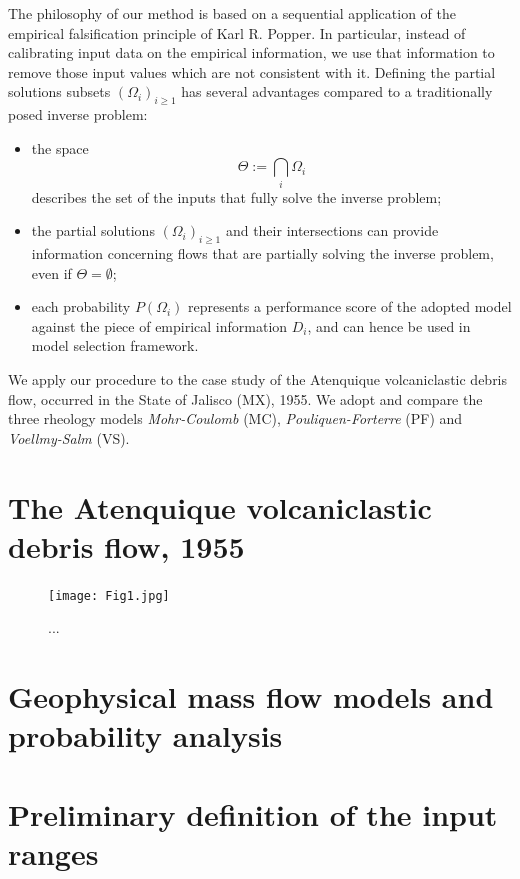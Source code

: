 \documentclass{article}
\begin{document}
The philosophy of our method is based on a sequential application of the empirical falsification principle of Karl R. Popper. In particular, instead of calibrating input data on the empirical information, we use that information to remove those input values which are not consistent with it. Defining the partial solutions subsets $(\Omega_i)_{i\ge1}$ has several advantages compared to a traditionally posed inverse problem: 
\begin{itemize}
  \item the space
  $$\Theta:=\bigcap_i \Omega_i$$ 
  describes the set of the inputs that fully solve the inverse problem; 
  \item the partial solutions $(\Omega_i)_{i\ge1}$ and their intersections can provide information concerning flows that are partially solving the inverse problem, even if $\Theta=\emptyset$;
  \item each probability $P(\Omega_i)$ represents a performance score of the adopted model against the piece of empirical information $D_i$, and can hence be used in model selection framework.
\end{itemize}
We apply our procedure to the case study of the Atenquique volcaniclastic debris flow, occurred in the State of Jalisco (MX), 1955. We adopt and compare the three rheology models \emph{Mohr-Coulomb} (MC), \emph{Pouliquen-Forterre} (PF) and \emph{Voellmy-Salm} (VS).

\section{The Atenquique volcaniclastic debris flow, 1955}

\begin{figure}[H]
\centering
\texttt{[image: Fig1.jpg]}
\caption{...}
\label{Fig1}
\end{figure}

\section{Geophysical mass flow models and probability analysis}


\section{Preliminary definition of the input ranges} 
\end{document}
